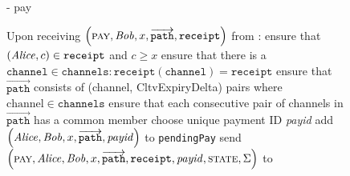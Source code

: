   \begin{figure}[H]
    \begin{systembox}{\fpaynet - pay}
      \begin{algorithmic}[1]
        \State Upon receiving $\left(\textsc{pay}, \mathit{Bob}, x,
        \overrightarrow{\mathtt{path}}, \mathtt{receipt}\right)$ from \alice:
        \Indent
          \State ensure that $\left(\mathit{Alice}, c\right) \in \mathtt{receipt}$ and
          $c \geq x$
          \State ensure that there is a $\mathtt{channel} \in \mathtt{channels}
          : \mathtt{receipt}\left(\mathtt{channel}\right) = \mathtt{receipt}$
          \State ensure that $\overrightarrow{\mathtt{path}}$ consists of
          (channel, CltvExpiryDelta) pairs where $\mathrm{channel} \in
          \mathtt{channels}$
          \State ensure that each consecutive pair of channels in
          $\overrightarrow{\mathtt{path}}$ has a common member
          \State choose unique payment ID \textit{payid}
          \State add $\left(\mathit{Alice}, \mathit{Bob}, x, \overrightarrow{\mathtt{path}},
          \mathit{payid}\right)$ to \texttt{pendingPay}
          \State send $\left(\textsc{pay}, \mathit{Alice}, \mathit{Bob}, x,
          \overrightarrow{\mathtt{path}}, \mathtt{receipt}, \mathit{payid},
          \textsc{state}, \Sigma\right)$ to \simulator
        \EndIndent
      \end{algorithmic}
    \end{systembox}
    \caption{}
    \label{alg:fpaynet:pay}
  \end{figure}

